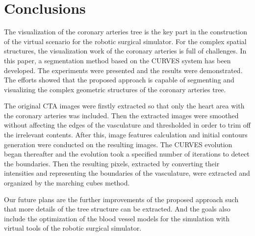 \section{Conclusions}
\label{sec:coronary_conclusions}

The visualization of the coronary arteries tree is the key part in the construction of the virtual scenario for the robotic surgical simulator.
For the complex spatial structures, the visualization work of the coronary arteries is full of challenges.
In this paper, a segmentation method based on the CURVES system has been developed.
The experiments were presented and the results were demonstrated.
The efforts showed that the proposed approach is capable of segmenting and visualizing the complex geometric structures of the coronary arteries tree.

The original CTA images were firstly extracted so that only the heart area with the coronary arteries was included.
Then the extracted images were smoothed without affecting the edges of the vasculature and thresholded in order to trim off the irrelevant contents.
After this, image features calculation and initial contours generation were conducted on the resulting images.
The CURVES evolution began thereafter and the evolution took a specified number of iterations to detect the boundaries.
Then the resulting pixels, extracted by converting their intensities and representing the boundaries of the vasculature, were extracted and organized by the marching cubes method.

Our future plans are the further improvements of the proposed approach such that more details of the tree structure can be extracted.
And the goals also include the optimization of the blood vessel models for the simulation with virtual tools of the robotic surgical simulator.